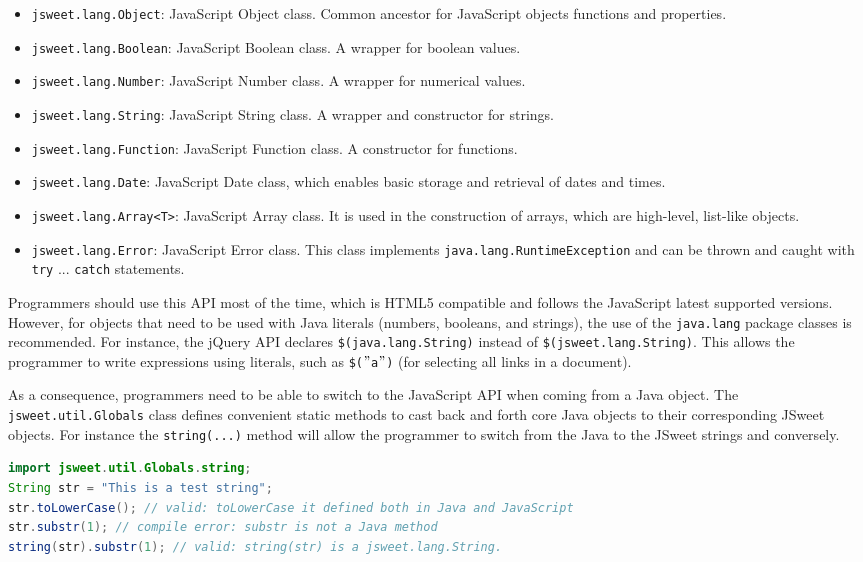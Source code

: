 \documentclass[a4paper]{report}
\begin{document}
\begin{itemize}
\item \texttt{jsweet.lang.Object}: JavaScript Object class. Common ancestor for JavaScript objects functions and properties.
\item \texttt{jsweet.lang.Boolean}: JavaScript Boolean class. A wrapper for boolean values.
\item \texttt{jsweet.lang.Number}: JavaScript Number class. A wrapper for numerical values.
\item \texttt{jsweet.lang.String}: JavaScript String class. A wrapper and constructor for strings.
\item \texttt{jsweet.lang.Function}: JavaScript Function class. A constructor for functions.
\item \texttt{jsweet.lang.Date}: JavaScript Date class, which enables basic storage and retrieval of dates and times.
\item \texttt{jsweet.lang.Array<T>}: JavaScript Array class. It is used in the construction of arrays, which are high-level, list-like objects.
\item \texttt{jsweet.lang.Error}: JavaScript Error class. This class implements \texttt{java.lang.RuntimeException} and can be thrown and caught with \texttt{try} ... \texttt{catch} statements.
\end{itemize}

Programmers should use this API most of the time, which is HTML5 compatible and follows the JavaScript latest supported versions. However, for objects that need to be used with Java literals (numbers, booleans, and strings), the use of the \texttt{java.lang} package classes is recommended. For instance, the jQuery API declares \texttt{\$(java.lang.String)} instead of \texttt{\$(jsweet.\-lang.\-String)}. This allows the programmer to write expressions using literals, such as \texttt{\$($"$a$"$)} (for selecting all links in a document).

As a consequence, programmers need to be able to switch to the JavaScript API when coming from a Java object. The \texttt{jsweet.util.Globals} class defines convenient static methods to cast back and forth core Java objects to their corresponding JSweet objects. For instance the \texttt{string(...)} method will allow the programmer to switch from the Java to the JSweet strings and conversely.

\begin{lstlisting}[language=Java]
import jsweet.util.Globals.string;
String str = "This is a test string";
str.toLowerCase(); // valid: toLowerCase it defined both in Java and JavaScript
str.substr(1); // compile error: substr is not a Java method
string(str).substr(1); // valid: string(str) is a jsweet.lang.String.
\end{lstlisting}
\end{document}

